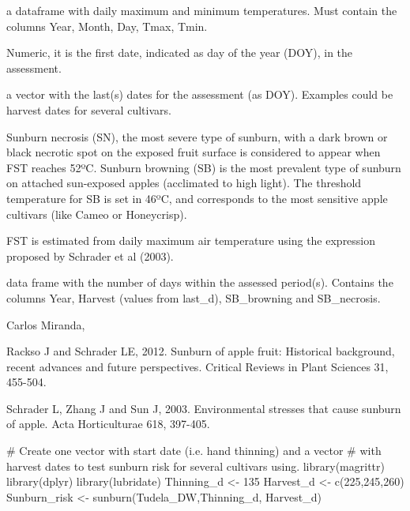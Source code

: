 \documentclass[a4paper]{book}
\begin{document}
%
\begin{Arguments}
\begin{ldescription}
\item[\code{climdata}] a dataframe with daily maximum and minimum temperatures.
Must contain the columns Year, Month, Day, Tmax, Tmin.

\item[\code{first\_d}] Numeric, it is the first date, indicated as day of the year
(DOY), in the assessment.

\item[\code{last\_d}] a vector with the last(s) dates for the assessment (as DOY).
Examples could be harvest dates for several cultivars.
\end{ldescription}
\end{Arguments}
%
\begin{Details}\relax
Sunburn necrosis (SN), the most severe type of sunburn, with a dark
brown or black necrotic spot on the exposed fruit surface is considered
to appear when FST reaches 52ºC. Sunburn browning (SB) is the most 
prevalent type of sunburn on attached sun-exposed apples (acclimated to
high light). The threshold temperature for SB is set in 46ºC, and 
corresponds to the most sensitive apple cultivars (like Cameo or 
Honeycrisp). 

FST is estimated from daily maximum air temperature using the expression
proposed by Schrader et al (2003).
\end{Details}
%
\begin{Value}
data frame with the number of days within the assessed period(s).
Contains the columns Year, Harvest (values from last\_d), SB\_browning
and SB\_necrosis.
\end{Value}
%
\begin{Author}\relax
Carlos Miranda, 
\end{Author}
%
\begin{References}\relax
Rackso J and Schrader LE, 2012. Sunburn of apple fruit: Historical
background, recent advances and future perspectives. Critical Reviews
in Plant Sciences 31, 455-504.

Schrader L, Zhang J and Sun J, 2003. Environmental stresses that cause
sunburn of apple. Acta Horticulturae 618, 397-405.
\end{References}
%
\begin{Examples}
\begin{ExampleCode}

# Create one vector with start date (i.e. hand thinning) and a vector 
# with harvest dates to test sunburn risk for several cultivars using.
library(magrittr)
library(dplyr)
library(lubridate)
Thinning_d <- 135
Harvest_d <- c(225,245,260)
Sunburn_risk <- sunburn(Tudela_DW,Thinning_d, Harvest_d)

\end{ExampleCode}
\end{Examples}
\end{document}

